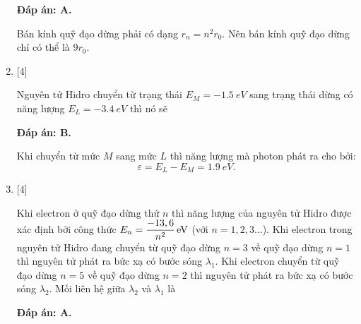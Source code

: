 \begin{enumerate}[label=\bfseries Câu \arabic*:]
		\loigiai
		{		\textbf{Đáp án: A.}

Bán kính quỹ đạo dừng phải có dạng $ r_{n} = n^{2} r_{0} $. Nên bán kính quỹ đạo dừng chỉ có thể là $ 9 r_{0} $. 
		}
		
		\item {} [4]
	
		\cauhoi
		{Nguyên tử Hidro chuyển từ trạng thái $ E_{M} = \SI{-1,5}{eV} $ sang trạng thái dừng có năng lượng $ E_{L} = \SI{-3,4}{eV} $ thì nó sẽ
		}
	
		\loigiai
		{		\textbf{Đáp án: B.}

Khi chuyển từ mức $ M $ sang mức $ L $ thì năng lượng mà photon phát ra cho bởi:
$$
	\varepsilon = E_{L} - E_{M} = \SI{1,9}{eV}.
$$
		}
		
		\item {} [4]
	
		\cauhoi
		{Khi electron ở quỹ đạo dừng thứ $ n $ thì năng lượng của nguyên tử Hidro được xác định bởi công thức $ E_{n} = \xsi{\dfrac{-13,6}{n^{2}}}{eV} $ (với $ n= 1,2,3... $). Khi electron trong nguyên tử Hidro đang chuyển từ quỹ đạo dừng $ n = 3 $ về quỹ đạo dừng $ n = 1 $ thì nguyên tử phát ra bức xạ có bước sóng $ \lambda_{1} $. Khi electron chuyển từ quỹ đạo dừng $ n = 5 $ về quỹ đạo dừng $ n = 2 $ thì nguyên tử phát ra bức xạ có bước sóng $ \lambda_{2} $. Mối liên hệ giữa $ \lambda_{2} $ và $ \lambda_{1} $ là
		}
	
		\loigiai
		{		\textbf{Đáp án: A.}

}
\end{enumerate}
